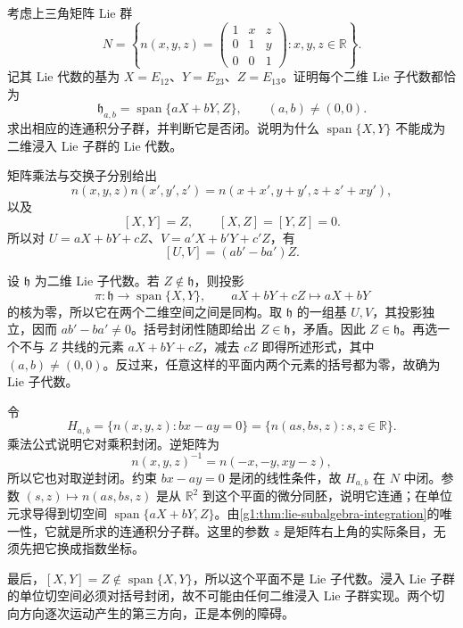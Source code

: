 \begin{exercise}\label{g1:ex:triangular-two-dimensional-subgroups}
	考虑上三角矩阵 Lie 群
	\[
		N=\left\{
		n(x,y,z)=
		\begin{pmatrix}
			1&x&z\\
			0&1&y\\
			0&0&1
		\end{pmatrix}:x,y,z\in\mathbb R
		\right\}.
	\]
	记其 Lie 代数的基为 \(X=E_{12}\)、\(Y=E_{23}\)、\(Z=E_{13}\)。证明每个二维 Lie 子代数都恰为
	\[
		\mathfrak h_{a,b}=\operatorname{span}\{aX+bY,Z\},
		\qquad(a,b)\ne(0,0).
	\]
	求出相应的连通积分子群，并判断它是否闭。说明为什么 \(\operatorname{span}\{X,Y\}\) 不能成为二维浸入 Lie 子群的 Lie 代数。
\end{exercise}
\begin{solution}
	矩阵乘法与交换子分别给出
	\[
		n(x,y,z)n(x',y',z')
		=n(x+x',y+y',z+z'+xy'),
	\]
	以及
	\[
		[X,Y]=Z,\qquad[X,Z]=[Y,Z]=0.
	\]
	所以对 \(U=aX+bY+cZ\)、\(V=a'X+b'Y+c'Z\)，有
	\[
		[U,V]=(ab'-ba')Z.
	\]

	设 \(\mathfrak h\) 为二维 Lie 子代数。若 \(Z\notin\mathfrak h\)，则投影
	\[
		\pi:\mathfrak h\longrightarrow\operatorname{span}\{X,Y\},
		\qquad aX+bY+cZ\longmapsto aX+bY
	\]
	的核为零，所以它在两个二维空间之间是同构。取 \(\mathfrak h\) 的一组基 \(U,V\)，其投影独立，因而 \(ab'-ba'\ne0\)。括号封闭性随即给出 \(Z\in\mathfrak h\)，矛盾。因此 \(Z\in\mathfrak h\)。再选一个不与 \(Z\) 共线的元素 \(aX+bY+cZ\)，减去 \(cZ\) 即得所述形式，其中 \((a,b)\ne(0,0)\)。反过来，任意这样的平面内两个元素的括号都为零，故确为 Lie 子代数。

	令
	\[
		H_{a,b}=\{n(x,y,z):bx-ay=0\}
		=\{n(as,bs,z):s,z\in\mathbb R\}.
	\]
	乘法公式说明它对乘积封闭。逆矩阵为
	\[
		n(x,y,z)^{-1}=n(-x,-y,xy-z),
	\]
	所以它也对取逆封闭。约束 \(bx-ay=0\) 是闭的线性条件，故 \(H_{a,b}\) 在 \(N\) 中闭。参数 \((s,z)\mapsto n(as,bs,z)\) 是从 \(\mathbb R^2\) 到这个平面的微分同胚，说明它连通；在单位元求导得到切空间 \(\operatorname{span}\{aX+bY,Z\}\)。由\cref{g1:thm:lie-subalgebra-integration}的唯一性，它就是所求的连通积分子群。这里的参数 \(z\) 是矩阵右上角的实际条目，无须先把它换成指数坐标。

	最后，\([X,Y]=Z\notin\operatorname{span}\{X,Y\}\)，所以这个平面不是 Lie 子代数。浸入 Lie 子群的单位切空间必须对括号封闭，故不可能由任何二维浸入 Lie 子群实现。两个切向方向逐次运动产生的第三方向，正是本例的障碍。
\end{solution}


